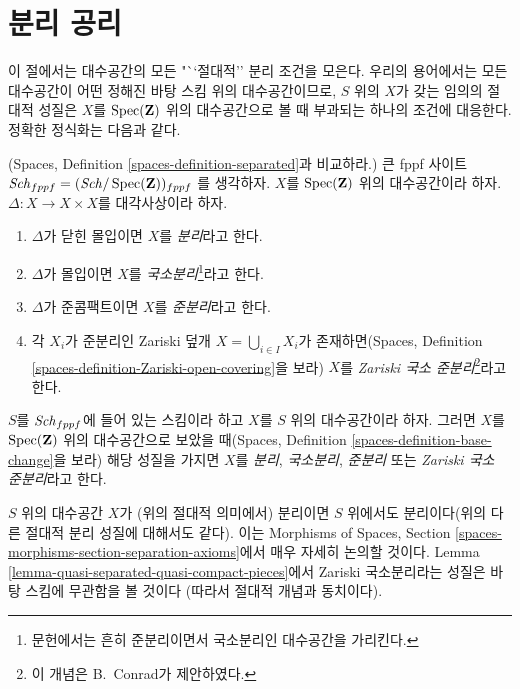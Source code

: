 \section{분리 공리}
\label{section-separation}

\noindent
이 절에서는 대수공간의 모든 "``절대적'' 분리 조건을 모은다.
우리의 용어에서는 모든 대수공간이 어떤 정해진 바탕 스킴 위의
대수공간이므로, $S$ 위의 $X$가 갖는 임의의 절대적 성질은
$X$를 $\mathop{\mathrm{Spec}}(\mathbf{Z})$ 위의 대수공간으로 볼 때 부과되는
하나의 조건에 대응한다. 정확한 정식화는 다음과 같다.

\begin{definition}
\label{definition-separated}
(Spaces, Definition \ref{spaces-definition-separated}과 비교하라.)
큰 fppf 사이트
$\mathit{Sch}_{fppf} = (\mathit{Sch}/\mathop{\mathrm{Spec}}(\mathbf{Z}))_{fppf}$
를 생각하자. $X$를
$\mathop{\mathrm{Spec}}(\mathbf{Z})$ 위의 대수공간이라 하자.
$\Delta : X \to X \times X$를 대각사상이라 하자.
\begin{enumerate}
\item $\Delta$가 닫힌 몰입이면 $X$를 {\it 분리}라고 한다.
\item $\Delta$가 몰입이면 $X$를
{\it 국소분리}\footnote{문헌에서는 흔히 준분리이면서
국소분리인 대수공간을 가리킨다.}라고 한다.
\item $\Delta$가 준콤팩트이면 $X$를 {\it 준분리}라고 한다.
\item 각 $X_i$가 준분리인 Zariski 덮개
$X = \bigcup_{i \in I} X_i$가 존재하면(Spaces,
Definition \ref{spaces-definition-Zariski-open-covering}을 보라)
$X$를 {\it Zariski 국소 준분리}\footnote{
이 개념은 B.\ Conrad가 제안하였다.}라고 한다.
\end{enumerate}
$S$를 $\mathit{Sch}_{fppf}$에 들어 있는 스킴이라 하고
$X$를 $S$ 위의 대수공간이라 하자. 그러면 $X$를
$\mathop{\mathrm{Spec}}(\mathbf{Z})$ 위의 대수공간으로 보았을 때(Spaces,
Definition \ref{spaces-definition-base-change}을 보라)
해당 성질을 가지면 $X$를 {\it 분리}, {\it 국소분리},
{\it 준분리} 또는 {\it Zariski 국소 준분리}라고 한다.
\end{definition}




\noindent
$S$ 위의 대수공간 $X$가 (위의 절대적 의미에서) 분리이면
$S$ 위에서도 분리이다(위의 다른 절대적 분리 성질에 대해서도 같다).
이는 Morphisms of Spaces, Section
\ref{spaces-morphisms-section-separation-axioms}에서 매우
자세히 논의할 것이다. Lemma
\ref{lemma-quasi-separated-quasi-compact-pieces}에서
Zariski 국소분리라는 성질은 바탕 스킴에 무관함을 볼 것이다
(따라서 절대적 개념과 동치이다).

